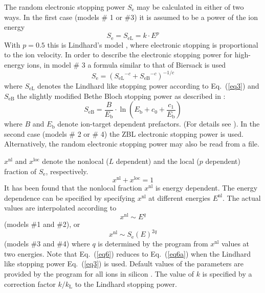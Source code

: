 The random electronic stopping power $S_\mathrm{e}$ may be calculated in either
of two ways. In the first case (models \# 1 or \#3) it is assumed to be a power
of the ion energy
%
\begin{equation}
   S_\mathrm{e} = S_\mathrm{eL} = k \cdot E^p
   \label{eq3}
\end{equation}
%
With $p = 0.5$ this is Lindhard's model \cite{I6101}, where electronic stopping
is proportional to the ion velocity. In order to describe the electronic stopping
power for high-energy ions, in model \# 3 a formula similar to that of Biersack
\cite{I8001} is used \cite{simionescu_model_1995} 
%
\begin{equation}
   S_\mathrm{e} = \left( {S_\mathrm{eL}}^{-c} + 
                         {S_\mathrm{eB}}^{-c} \right) ^ {-1/c}
\end{equation}
%
where $S_\mathrm{eL}$ denotes the Lindhard like stopping power according to
Eq.~(\ref{eq3}) and $S_\mathrm{eB}$ the slightly modified Bethe Bloch stopping
power as described in \cite{I8001}:
%
\begin{equation}
   S_\mathrm{eB} = \frac{B}{E_\mathrm{b}} \cdot
      \ln \left( {E_\mathrm{b} + c_0 + \frac{c_1}{E_\mathrm{b}}}\right)
   \label{eq3a}
\end{equation}
%
where $B$ and $E_\mathrm{b}$ denote ion-target dependent prefactors. (For
details see \cite{I8001}).  In the second case (models \# 2 or \# 4) the ZBL
electronic stopping power \cite{I8512} is used. Alternatively, the random
electronic stopping power may also be read from a file.

$x^\mathrm{nl}$ and $x^\mathrm{loc}$ denote the nonlocal ($L$ dependent) and the
local ($p$ dependent) fraction of $S_\mathrm{e}$, respectively.
%
\begin{equation}
   x^\mathrm{nl} + x^\mathrm{loc} = 1
   \label{eq4}
\end{equation}
%
It has been found that the nonlocal fraction $x^\mathrm{nl}$ is energy
dependent. The energy dependence can be specified by specifying $x^\mathrm{nl}$
at different energies $E^\mathrm{nl}$. The actual values are interpolated
according to
%
\begin{equation}
   x^\mathrm{nl} \sim E^q
   \label{eq6a}
\end{equation}
%
(models \#1 and \#2), or
%
\begin{equation}
   x^\mathrm{nl} \sim S_\mathrm{e}(E) ^{2q}
   \label{eq6}
\end{equation}
%
(models \#3 and \#4) where $q$ is determined by the program from
$x^\mathrm{nl}$ values at two energies. Note that Eq.~(\ref{eq6}) reduces to
Eq.~(\ref{eq6a}) when the Lindhard like stopping power Eq.~(\ref{eq3}) is used. 
Default values of the parameters are provided by the program for all ions in
silicon \cite{hobler_monte_1995, hobler_towards_2000, hobler_boron_1995,
simionescu_modeling_1995, hobler_electronic_1993, hobler_random_2006}.
The value of $k$ is specified by a correction factor $k/k_\mathrm{L}$ to the
Lindhard stopping power. 


